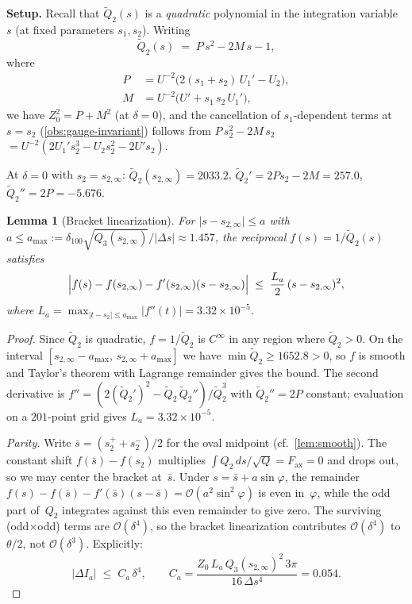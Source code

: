 \documentclass[11pt,a4paper]{article}
\theoremstyle{plain}
\newtheorem{lemma}[theorem]{Lemma}
\theoremstyle{definition}
\theoremstyle{remark}
\newcommand{\Oo}{\mathcal{O}}
\begin{document}
\medskip
\noindent\textbf{Setup.}
Recall that $\tilde Q_2(s)$ is a \emph{quadratic} polynomial
in the integration variable~$s$ (at fixed parameters $s_1,s_2$).
Writing
\begin{equation}\label{eq:Qt2-quad}
  \tilde Q_2(s) \;=\; P\,s^2 - 2M\,s - 1,
\end{equation}
where
\begin{align}
  P &= U^{-2}\bigl(2(s_1+s_2)\,U_1' - U_2\bigr),
  \label{eq:P-coeff} \\
  M &= U^{-2}\bigl(U' + s_1\,s_2\,U_1'\bigr),
  \label{eq:M-coeff}
\end{align}
we have $Z_0^2 = P + M^2$ (at $\delta=0$), and
the cancellation of $s_1$-dependent terms at $s = s_2$
(\cref{obs:gauge-invariant}) follows from
$P\,s_2^2 - 2M\,s_2$
$= U^{-2}(2U_1' s_2^3 - U_2 s_2^2 - 2U' s_2)$.

\smallskip
At $\delta = 0$ with $s_2 = s_{2,\infty}$:
$\tilde Q_2(s_{2,\infty}) = 2033.2$, \;
$\tilde Q_2' = 2Ps_2 - 2M = 257.0$, \;
$\tilde Q_2'' = 2P = -5.676$.

\begin{lemma}[Bracket linearization]\label{lem:bracket}
  For $\lvert s - s_{2,\infty}\rvert \le a$
  with $a \le a_{\max} := \delta_{\!100}\sqrt{Q_3(s_{2,\infty})}/\lvert\Delta s\rvert
  \approx 1.457$,
  the reciprocal $f(s) = 1/\tilde Q_2(s)$ satisfies
  \[
    \Bigl\lvert f(s) - f(s_{2,\infty})
      - f'(s_{2,\infty})(s - s_{2,\infty})\Bigr\rvert
    \;\le\; \frac{L_a}{2}\,(s - s_{2,\infty})^2,
  \]
  where $L_a = \max_{\lvert t - s_{2}\rvert \le a_{\max}}
  \lvert f''(t)\rvert = 3.32 \times 10^{-5}$.
\end{lemma}

\begin{proof}
  Since $\tilde Q_2$ is quadratic, $f = 1/\tilde Q_2$ is $C^\infty$
  in any region where $\tilde Q_2 > 0$.  On the interval
  $[s_{2,\infty} - a_{\max},\, s_{2,\infty} + a_{\max}]$ we have
  $\min \tilde Q_2 \ge 1652.8 > 0$, so $f$ is smooth and
  Taylor's theorem with Lagrange remainder gives the bound.
  The second derivative is
  $f'' = (2(\tilde Q_2')^2 - \tilde Q_2\,\tilde Q_2'')/\tilde Q_2^3$
  with $\tilde Q_2'' = 2P$ constant; evaluation on a $201$-point
  grid gives $L_a = 3.32 \times 10^{-5}$.

  \smallskip
  \emph{Parity.}  Write $\bar s = (s_2^{+}+s_2^{-})/2$ for the
  oval midpoint (cf.\ \cref{lem:smooth}).  The constant shift
  $f(\bar s) - f(s_2)$ multiplies
  $\int Q_2\,ds/\!\sqrt{Q} = F_{\mathrm{ax}} = 0$
  and drops out, so we may center the bracket at~$\bar s$.
  Under $s = \bar s + a\sin\varphi$,
  the remainder
  $f(s) - f(\bar s) - f'(\bar s)(s{-}\bar s)
  = \Oo(a^2\sin^2\!\varphi)$
  is even in~$\varphi$, while the odd part of~$Q_2$
  integrates against this even remainder to give zero.
  The surviving (odd$\times$odd) terms are $\Oo(\delta^4)$,
  so the bracket linearization contributes $\Oo(\delta^4)$ to
  $\theta/2$, not $\Oo(\delta^3)$.
  Explicitly:
  \[
    \lvert\Delta I_a\rvert
    \;\le\; C_a\,\delta^4,
    \qquad
    C_a
    = \frac{Z_0\,L_a\,Q_3(s_{2,\infty})^2\,3\pi}
           {16\,\Delta s^4}
    = 0.054.
  \]
\end{proof}
\end{document}
